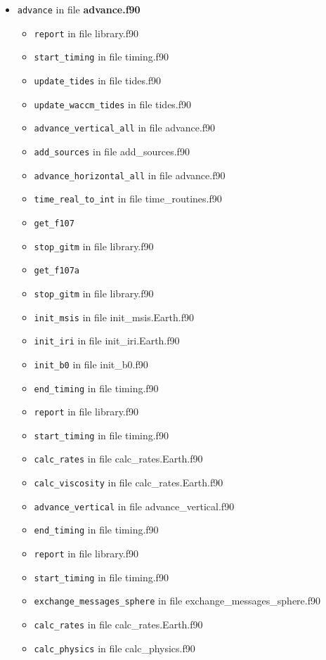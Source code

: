 \begin{itemize}
\begin{itemize}
  \item {\tt advance}   in file {\bf advance.f90}
    \begin{itemize}
      \item {\tt report} in file library.f90
      \item {\tt start\_timing} in file timing.f90
      \item {\tt update\_tides} in file tides.f90
      \item {\tt update\_waccm\_tides} in file tides.f90
      \item {\tt advance\_vertical\_all} in file advance.f90
      \item {\tt add\_sources} in file add\_sources.f90
      \item {\tt advance\_horizontal\_all} in file advance.f90
      \item {\tt time\_real\_to\_int} in file time\_routines.f90
      \item {\tt get\_f107}
      \item {\tt stop\_gitm} in file library.f90
      \item {\tt get\_f107a}
      \item {\tt stop\_gitm} in file library.f90
      \item {\tt init\_msis} in file init\_msis.Earth.f90
      \item {\tt init\_iri} in file init\_iri.Earth.f90
      \item {\tt init\_b0} in file init\_b0.f90
      \item {\tt end\_timing} in file timing.f90
      \item {\tt report} in file library.f90
      \item {\tt start\_timing} in file timing.f90
      \item {\tt calc\_rates} in file calc\_rates.Earth.f90
      \item {\tt calc\_viscosity} in file calc\_rates.Earth.f90
      \item {\tt advance\_vertical} in file advance\_vertical.f90
      \item {\tt end\_timing} in file timing.f90
      \item {\tt report} in file library.f90
      \item {\tt start\_timing} in file timing.f90
      \item {\tt exchange\_messages\_sphere} in file exchange\_messages\_sphere.f90
      \item {\tt calc\_rates} in file calc\_rates.Earth.f90
      \item {\tt calc\_physics} in file calc\_physics.f90

\end{itemize}
\end{itemize}
\end{itemize}
